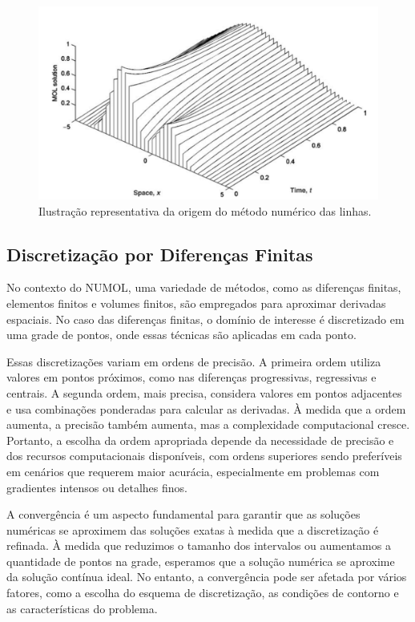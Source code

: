 \begin{figure}[H]
    \centering
    \caption{Ilustração representativa da origem do método numérico das linhas.}
    \includegraphics[scale=0.3]{figures/others/method_of_lines.png}
\end{figure}

\subsection{Discretização por Diferenças Finitas}

No contexto do NUMOL, uma variedade de métodos, como as diferenças finitas, elementos finitos e volumes finitos, são empregados para aproximar derivadas espaciais. No caso das diferenças finitas, o domínio de interesse é discretizado em uma grade de pontos, onde essas técnicas são aplicadas em cada ponto.

Essas discretizações variam em ordens de precisão. A primeira ordem utiliza valores em pontos próximos, como nas diferenças progressivas, regressivas e centrais. A segunda ordem, mais precisa, considera valores em pontos adjacentes e usa combinações ponderadas para calcular as derivadas. À medida que a ordem aumenta, a precisão também aumenta, mas a complexidade computacional cresce. Portanto, a escolha da ordem apropriada depende da necessidade de precisão e dos recursos computacionais disponíveis, com ordens superiores sendo preferíveis em cenários que requerem maior acurácia, especialmente em problemas com gradientes intensos ou detalhes finos.

A convergência é um aspecto fundamental para garantir que as soluções numéricas se aproximem das soluções exatas à medida que a discretização é refinada. À medida que reduzimos o tamanho dos intervalos ou aumentamos a quantidade de pontos na grade, esperamos que a solução numérica se aproxime da solução contínua ideal. No entanto, a convergência pode ser afetada por vários fatores, como a escolha do esquema de discretização, as condições de contorno e as características do problema.

